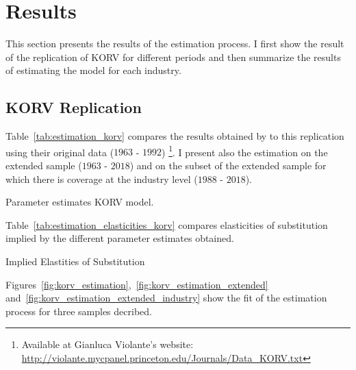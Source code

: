 \documentclass[12pt]{article}
\begin{document}
\section{Results}\label{sec:results}
This section presents the results of the estimation process. I first show the result of the replication of KORV for different periods and then summarize the results of estimating the model for each industry.
\subsection{KORV Replication}\label{sec:results_original}
Table~\ref{tab:estimation_korv} compares the results obtained by \citep{krusell2000capital} to this replication using their 
original data ($1963$ - $1992$) \footnote{Available at Gianluca Violante's website: \url{http://violante.mycpanel.princeton.edu/Journals/Data_KORV.txt}}. I present also the estimation on the extended sample ($1963$ - $2018$) and on the subset of the extended sample for which there is coverage at the industry level ($1988$ - $2018$). 

\begin{table}[h]
\begin{center}
 
 \caption{\label{tab:estimation_korv} Parameter estimates KORV model.}
\end{center}
\end{table}

Table~\ref{tab:estimation_elasticities_korv} compares elasticities of substitution implied by the different parameter estimates obtained.

\begin{table}[h]
 \begin{center}
 
 \caption{\label{tab:estimation_elasticities_korv} Implied Elastities of Substitution}
 \end{center}
 \end{table}

Figures~\ref{fig:korv_estimation},~\ref{fig:korv_estimation_extended} and~\ref{fig:korv_estimation_extended_industry} show the fit of the estimation process for three samples decribed. 
\end{document}
